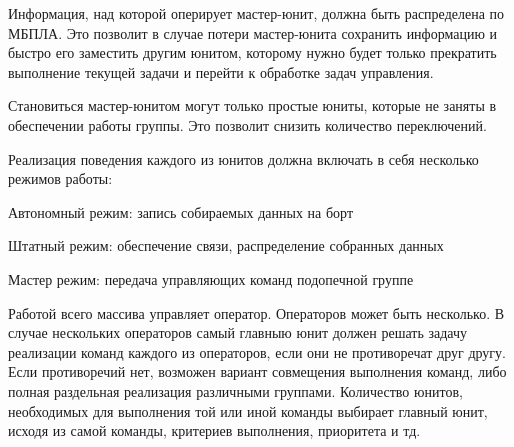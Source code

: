 Информация, над которой оперирует мастер-юнит, должна быть распределена по
МБПЛА. Это позволит в случае потери мастер-юнита сохранить информацию
и быстро его заместить другим юнитом, которому нужно будет только
прекратить выполнение текущей задачи и перейти к обработке задач управления.

Становиться мастер-юнитом могут только простые юниты, которые не заняты в
обеспечении работы группы. Это позволит снизить количество переключений.

Реализация поведения каждого из юнитов должна включать в себя
несколько режимов работы:

\begin{mintemize}
\item Автономный режим: запись собираемых данных на борт
\item Штатный режим: обеспечение связи, распределение собранных данных
\item Мастер режим: передача управляющих команд подопечной группе
\end{mintemize}

Работой всего массива управляет оператор. Операторов может быть несколько.
В случае нескольких операторов самый главныю юнит должен решать задачу
реализации команд каждого из операторов, если они не противоречат друг другу.
Если противоречий нет, возможен вариант совмещения выполнения команд, либо
полная раздельная реализация различными группами. Количество юнитов, необходимых
для выполнения той или иной команды выбирает главный юнит, исходя из самой 
команды, критериев выполнения, приоритета и тд.

